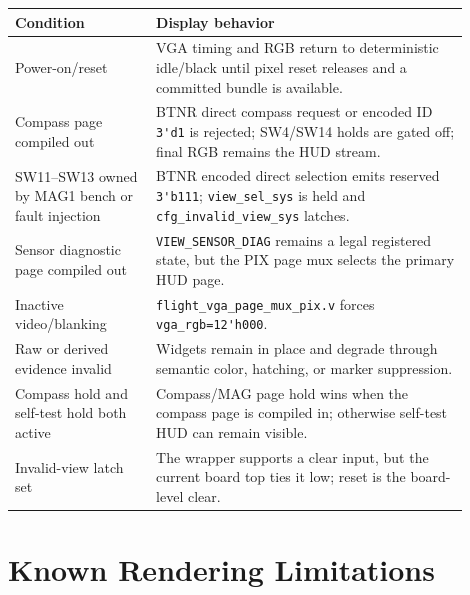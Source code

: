 \documentclass{article}
\newcommand{\sig}[1]{\begingroup\nolinkurl{#1}\endgroup}
\newcommand{\file}[1]{\begingroup\nolinkurl{#1}\endgroup}
\begin{document}
\begin{longtable}{p{0.28\linewidth} p{0.62\linewidth}}
\toprule
\textbf{Condition} & \textbf{Display behavior} \\
\midrule
\endhead
Power-on/reset & VGA timing and RGB return to deterministic idle/black until
pixel reset releases and a committed bundle is available. \\
Compass page compiled out & BTNR direct compass request or encoded ID
\sig{3'd1} is rejected; SW4/SW14 holds are gated off; final RGB remains the HUD
stream. \\
SW11--SW13 owned by MAG1 bench or fault injection & BTNR encoded direct
selection emits reserved \sig{3'b111}; \sig{view_sel_sys} is held and
\sig{cfg_invalid_view_sys} latches. \\
Sensor diagnostic page compiled out & \sig{VIEW_SENSOR_DIAG} remains a legal
registered state, but the PIX page mux selects the primary HUD page. \\
Inactive video/blanking & \file{flight_vga_page_mux_pix.v} forces
\sig{vga_rgb=12'h000}. \\
Raw or derived evidence invalid & Widgets remain in place and degrade through
semantic color, hatching, or marker suppression. \\
Compass hold and self-test hold both active & Compass/MAG page hold wins when
the compass page is compiled in; otherwise self-test HUD can remain visible. \\
Invalid-view latch set & The wrapper supports a clear input, but the current
board top ties it low; reset is the board-level clear. \\
\bottomrule
\end{longtable}

\section{Known Rendering Limitations}
\end{document}
